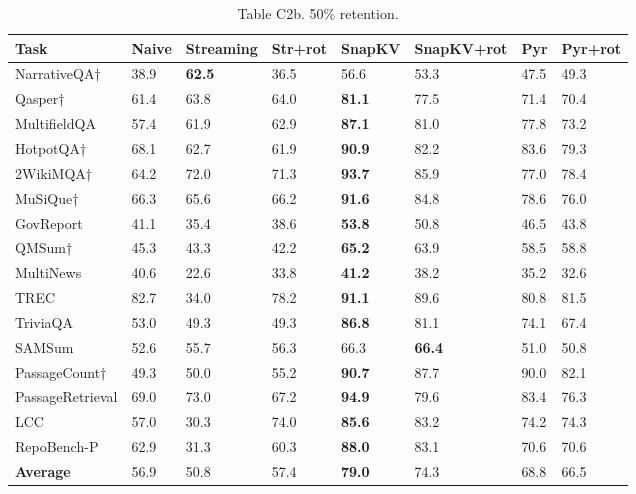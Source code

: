 \documentclass[10pt,letterpaper]{article}
\begin{document}
\begin{table}[H]
\centering
\small
\caption*{Table C2b. 50\% retention.}
\begin{tabular}{@{}llllllll@{}}
\toprule
Task & Naive & Streaming & Str+rot & SnapKV & SnapKV+rot & Pyr &
Pyr+rot\\
\midrule
    NarrativeQA† & 38.9 & \textbf{62.5} & 36.5 & 56.6 & 53.3 & 47.5 & 49.3\\
    Qasper† & 61.4 & 63.8 & 64.0 & \textbf{81.1} & 77.5 & 71.4 & 70.4\\
    MultifieldQA & 57.4 & 61.9 & 62.9 & \textbf{87.1} & 81.0 & 77.8 & 73.2\\
    HotpotQA† & 68.1 & 62.7 & 61.9 & \textbf{90.9} & 82.2 & 83.6 & 79.3\\
    2WikiMQA† & 64.2 & 72.0 & 71.3 & \textbf{93.7} & 85.9 & 77.0 & 78.4\\
    MuSiQue† & 66.3 & 65.6 & 66.2 & \textbf{91.6} & 84.8 & 78.6 & 76.0\\
    GovReport & 41.1 & 35.4 & 38.6 & \textbf{53.8} & 50.8 & 46.5 & 43.8\\
    QMSum† & 45.3 & 43.3 & 42.2 & \textbf{65.2} & 63.9 & 58.5 & 58.8\\
    MultiNews & 40.6 & 22.6 & 33.8 & \textbf{41.2} & 38.2 & 35.2 & 32.6\\
    TREC & 82.7 & 34.0 & 78.2 & \textbf{91.1} & 89.6 & 80.8 & 81.5\\
    TriviaQA & 53.0 & 49.3 & 49.3 & \textbf{86.8} & 81.1 & 74.1 & 67.4\\
    SAMSum & 52.6 & 55.7 & 56.3 & 66.3 & \textbf{66.4} & 51.0 & 50.8\\
    PassageCount† & 49.3 & 50.0 & 55.2 & \textbf{90.7} & 87.7 & 90.0 & 82.1\\
    PassageRetrieval & 69.0 & 73.0 & 67.2 & \textbf{94.9} & 79.6 & 83.4 & 76.3\\
    LCC & 57.0 & 30.3 & 74.0 & \textbf{85.6} & 83.2 & 74.2 & 74.3\\
    RepoBench-P & 62.9 & 31.3 & 60.3 & \textbf{88.0} & 83.1 & 70.6 & 70.6\\
    \textbf{Average} & 56.9 & 50.8 & 57.4 & \textbf{79.0} & 74.3 & 68.8 & 66.5\\
\bottomrule
\end{tabular}
\end{table}
\end{document}
